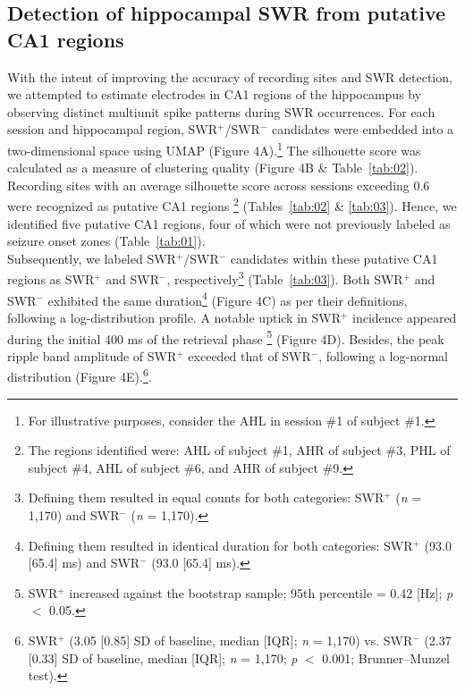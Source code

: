 \documentclass[final,3p,times,twocolumn]{elsarticle}
\begin{document}
\subsection{Detection of hippocampal SWR from putative CA1 regions}
With the intent of improving the accuracy of recording sites and SWR detection, we attempted to estimate electrodes in CA1 regions of the hippocampus by observing distinct multiunit spike patterns during SWR occurrences. For each session and hippocampal region, SWR$^+$/SWR$^-$ candidates were embedded into a two-dimensional space using UMAP (Figure 4A).\footnote{For illustrative purposes, consider the AHL in session \#1 of subject \#1.} The silhouette score was calculated as a measure of clustering quality (Figure 4B \& Table~\ref{tab:02}). Recording sites with an average silhouette score across sessions exceeding 0.6 were recognized as putative CA1 regions \cite{mcinnes_umap_2018, rousseeuw_silhouettes_1987} \footnote{The regions identified were: AHL of subject \#1, AHR of subject \#3, PHL of subject \#4, AHL of subject \#6, and AHR of subject \#9.}  (Tables~\ref{tab:02} \& \ref{tab:03}). Hence, we identified five putative CA1 regions, four of which were not previously labeled as seizure onset zones (Table~\ref{tab:01}).
\\
\indent
Subsequently, we labeled SWR$^+$/SWR$^-$ candidates within these putative CA1 regions as SWR$^+$ and SWR$^-$, respectively\footnote{Defining them resulted in equal counts for both categories: SWR$^+$ (\textit{n} = 1,170) and SWR$^-$ (\textit{n} = 1,170).}  (Table~\ref{tab:03}). Both SWR$^+$ and SWR$^-$ exhibited the same duration\footnote{Defining them resulted in identical duration for both categories: SWR$^+$ (93.0 [65.4] ms) and SWR$^-$ (93.0 [65.4] ms).}  (Figure 4C) as per their definitions, following a log-distribution profile. A notable uptick in SWR$^+$ incidence appeared during the initial 400 ms of the retrieval phase \footnote{SWR$^+$ increased against the bootstrap sample; 95th percentile = 0.42 [Hz]; \textit{p} $<$ 0.05.}  (Figure 4D). Besides, the peak ripple band amplitude of SWR$^+$ exceeded that of SWR$^-$, following a log-normal distribution (Figure 4E).\footnote{SWR$^+$ (3.05 [0.85] SD of baseline, median [IQR]; \textit{n} = 1,170) vs. SWR$^-$ (2.37 [0.33] SD of baseline, median [IQR]; \textit{n} = 1,170; \textit{p} $<$ 0.001; Brunner--Munzel test).}.
\end{document}
